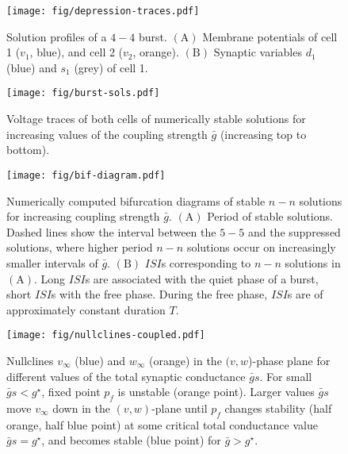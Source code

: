 \documentclass[utf8, draft]{frontiersFPHY} %
\newcommand{\gbar}{\bar g}
\begin{document}
\begin{figure}[h!]
  \centering
  \texttt{[image: fig/depression-traces.pdf]}
  \caption{Solution profiles of a $4-4$ burst. $\bm{\mathrm{(A)}}$ Membrane potentials
    of cell 1 ($v_{1}$, blue), and cell 2 ($v_{2}$, orange). $\bm{\mathrm{(B)}}$
    Synaptic variables $d_{1}$ (blue) and $s_{1}$ (grey) of cell
    1.~\label{fig:depression-traces}}
\end{figure}

\begin{figure}[h!]
  \centering
  \texttt{[image: fig/burst-sols.pdf]}
  \caption{Voltage traces of both cells of numerically stable solutions for increasing
    values of the coupling strength $\gbar$ (increasing top to
    bottom).~\label{fig:burst-sols}}
\end{figure}

\begin{figure}[h!]
  \centering
  \texttt{[image: fig/bif-diagram.pdf]}
  \caption{Numerically computed bifurcation diagrams of stable $n-n$ solutions for
    increasing coupling strength $\gbar$. $\bm{\mathrm{(A)}}$ Period of stable
    solutions. Dashed lines show the interval between the $5-5$ and the suppressed
    solutions, where higher period $n-n$ solutions occur on increasingly smaller intervals
    of $\gbar$. $\bm{\mathrm{(B)}}$ $ISI$s corresponding to $n-n$ solutions in
    $\mathrm{(A)}$. Long $ISI$s are associated with the quiet phase of a burst, short
    $ISI$s with the free phase. During the free phase, $ISI$s are of approximately
    constant duration $T$.\label{fig:bif-diagram}}
\end{figure}

\begin{figure}[h!]
  \centering
  \texttt{[image: fig/nullclines-coupled.pdf]}
  \caption{Nullclines $v_{\infty}$ (blue) and $w_{\infty}$ (orange) in the
  $(v,w$)-phase plane for different values of the total synaptic conductance $\gbar
  s$. For small $\gbar s < g^{\star}$, fixed point $p_{f}$ is unstable (orange
  point). Larger values $\gbar s$ move $v_{\infty}$ down in the $(v,w)$-plane until
  $p_{f}$ changes stability (half orange,  half blue point) at some critical total
  conductance value $\gbar s = g^{\star}$, and becomes stable (blue point) for
  $\gbar>g^{\star}$.~\label{fig:nullclines-coupled}}
\end{figure}
\end{document}
